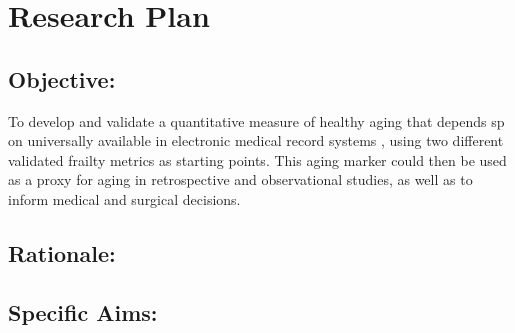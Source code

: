 \section{Research Plan }\label{research-plan}


\subsection{Objective:}\label{objective}
  
To develop and validate a quantitative measure of healthy aging that depends sp on universally available in electronic medical record systems ,
using two different validated frailty metrics as starting points. This
aging marker could then be used as a proxy for aging in retrospective
and observational studies, as well as to inform medical and surgical
decisions.


\subsection{Rationale:}\label{rationale}

\subsection{Specific Aims:}\label{specific-aims}
